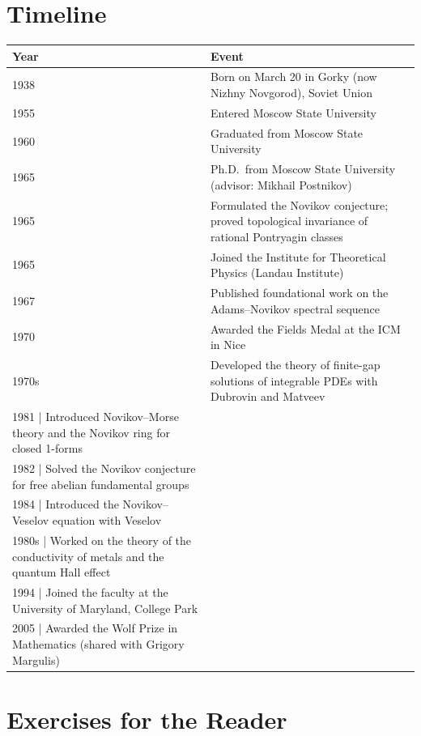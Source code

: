 \section*{Timeline}
\begin{tabularx}{\linewidth}{|p{1.5cm}|>{\raggedright\arraybackslash}X|}
\hline
\textbf{Year} & \textbf{Event} \\ \hline
1938 & Born on March 20 in Gorky (now Nizhny Novgorod), Soviet Union \\ \hline
1955 & Entered Moscow State University \\ \hline
1960 & Graduated from Moscow State University \\ \hline
1965 & Ph.D.\ from Moscow State University (advisor: Mikhail Postnikov) \\ \hline
1965 & Formulated the Novikov conjecture; proved topological invariance of rational Pontryagin classes \\ \hline
1965 & Joined the Institute for Theoretical Physics (Landau Institute) \\ \hline
1967 & Published foundational work on the Adams--Novikov spectral sequence \\ \hline
1970 & Awarded the Fields Medal at the ICM in Nice \\ \hline
1970s & Developed the theory of finite-gap solutions of integrable PDEs with Dubrovin and Matveev \\ \hline
1981 | Introduced Novikov--Morse theory and the Novikov ring for closed 1-forms \\ \hline
1982 | Solved the Novikov conjecture for free abelian fundamental groups \\ \hline
1984 | Introduced the Novikov--Veselov equation with Veselov \\ \hline
1980s | Worked on the theory of the conductivity of metals and the quantum Hall effect \\ \hline
1994 | Joined the faculty at the University of Maryland, College Park \\ \hline
2005 | Awarded the Wolf Prize in Mathematics (shared with Grigory Margulis) \\ \hline
\end{tabularx}

\section*{Exercises for the Reader}

